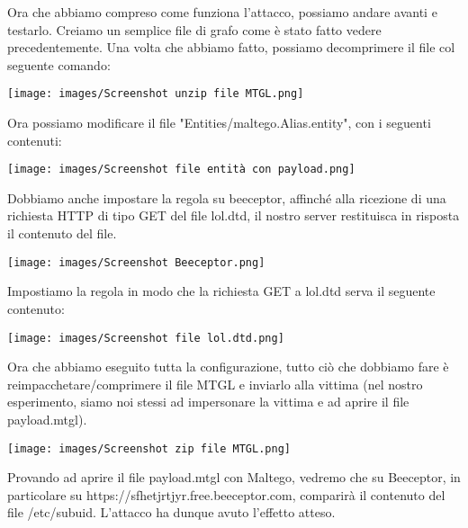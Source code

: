 \begin{flushleft}
Ora che abbiamo compreso come funziona l'attacco, possiamo andare avanti e testarlo. Creiamo un semplice file di grafo come è stato fatto vedere precedentemente. Una volta che abbiamo fatto, possiamo decomprimere il file col seguente comando:
\end{flushleft}

\texttt{[image: images/Screenshot unzip file MTGL.png]}

\begin{flushleft}
Ora possiamo modificare il file "Entities/maltego.Alias.entity", con i seguenti contenuti:
\end{flushleft}

\texttt{[image: images/Screenshot file entità con payload.png]}

\begin{flushleft}
Dobbiamo anche impostare la regola su beeceptor, affinché alla ricezione di una richiesta HTTP di tipo GET del file lol.dtd, il nostro server restituisca in risposta il contenuto del file.
\end{flushleft}

\texttt{[image: images/Screenshot Beeceptor.png]}

\begin{flushleft}
Impostiamo la regola in modo che la richiesta GET a lol.dtd serva il seguente contenuto:
\end{flushleft}

\texttt{[image: images/Screenshot file lol.dtd.png]}


\begin{flushleft}
Ora che abbiamo eseguito tutta la configurazione, tutto ciò che dobbiamo fare è reimpacchetare/comprimere il file MTGL e inviarlo alla vittima (nel nostro esperimento, siamo noi stessi ad impersonare la vittima e ad aprire il file payload.mtgl).
\end{flushleft}


\texttt{[image: images/Screenshot zip file MTGL.png]}

\begin{flushleft}
Provando ad aprire il file payload.mtgl con Maltego, vedremo che su Beeceptor, in particolare su https://sfhetjrtjyr.free.beeceptor.com, comparirà il contenuto del file /etc/subuid. L'attacco ha dunque avuto l'effetto atteso.
\end{flushleft}
